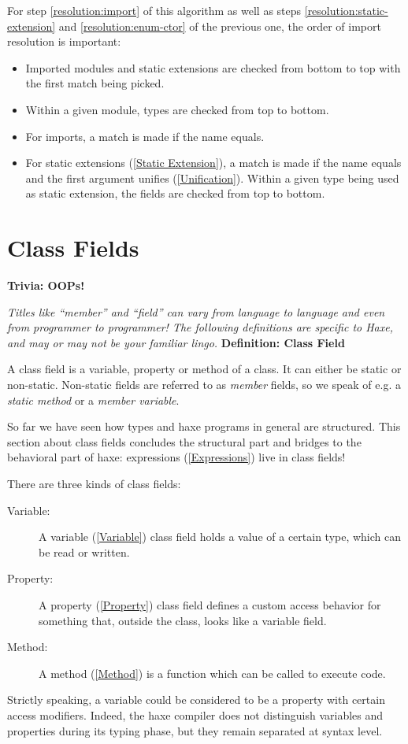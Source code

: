 \documentclass{article}
\newenvironment{myshaded}
  {\def\FrameCommand{\fboxsep=\topsep\colorbox{bgcolor}}%
  \MakeFramed {\advance\hsize-\width \FrameRestore}}%
 {\endMakeFramed}
\newcommand{\define}[3][Definition]
	{\begin{myshaded}\noindent\textbf{#1: #2}\par\nobreak\noindent\ignorespaces#3\label{def:#2}\end{myshaded}}
\newcommand{\trivia}[2]
	{\begin{myshaded}\noindent\textbf{Trivia: #1}\par\nobreak\noindent\ignorespaces\textit{#2}\end{myshaded}}
\newcommand{\tref}[2]{#1 (\ref{#2})}
\begin{document}
For step \ref{resolution:import} of this algorithm as well as steps \ref{resolution:static-extension} and \ref{resolution:enum-ctor} of the previous one, the order of import resolution is important:

\begin{itemize}
	\item Imported modules and static extensions are checked from bottom to top with the first match being picked.
	\item Within a given module, types are checked from top to bottom.
	\item For imports, a match is made if the name equals.
	\item For \tref{static extensions}{Static Extension}, a match is made if the name equals and the first argument \tref{unifies}{Unification}. Within a given type being used as static extension, the fields are checked from top to bottom.
\end{itemize}




\section{Class Fields}
\label{Class Fields}
\trivia{OOPs!}{Titles like ``member'' and ``field'' can vary from language to language and even from programmer to programmer!  The following definitions are specific to Haxe, and may or may not be your familiar lingo.}
\define{Class Field}{A class field is a variable, property or method of a class.  It can either be static or non-static. Non-static fields are referred to as \emph{member} fields, so we speak of e.g. a \emph{static method} or a \emph{member variable}.}

So far we have seen how types and haxe programs in general are structured. This section about class fields concludes the structural part and bridges to the behavioral part of haxe: \tref{expressions}{Expressions} live in class fields!

There are three kinds of class fields:

\begin{description}
	\item[Variable:] A \tref{variable}{Variable} class field holds a value of a certain type, which can be read or written.
	\item[Property:] A \tref{property}{Property} class field defines a custom access behavior for something that, outside the class, looks like a variable field.
	\item[Method:] A \tref{method}{Method} is a function which can be called to execute code.
\end{description}
Strictly speaking, a variable could be considered to be a property with certain access modifiers. Indeed, the haxe compiler does not distinguish variables and properties during its typing phase, but they remain separated at syntax level.
\end{document}
